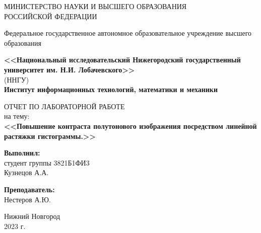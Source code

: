 \documentclass[a4paper,12pt]{article}
\begin{document}
\begin{titlepage}
	\begin{center}
		\large
		{МИНИСТЕРСТВО НАУКИ И ВЫСШЕГО ОБРАЗОВАНИЯ\\ РОССИЙСКОЙ ФЕДЕРАЦИИ}
		
		Федеральное государственное автономное образовательное учреждение высшего образования
		\vspace{0.5cm}
		
		\textbf{<<Национальный исследовательский Нижегородский государственный университет им. Н.И. Лобачевского>>}\\
		(ННГУ)\\
		\vspace{1cm}
		\textbf{Институт информационных технологий, математики и механики}\\
		\vfill
		
		\Large
		ОТЧЕТ ПО ЛАБОРАТОРНОЙ РАБОТЕ\\
		на тему:\\
		\textbf{<<Повышение контраста полутонового изображения посредством 
линейной растяжки гистограммы.>>}
		{\LARGE 
		}
		\bigskip
		
		
	\end{center}
	\vfill
	
	\newlength{\ML}
	\hfill\begin{minipage}{0.4\textwidth}
		\textbf{Выполнил:}\\
		студент группы 3821Б1ФИ3\\
		\underline{\hspace{3cm}} Кузнецов А.А.\\
	\end{minipage}%
	\bigskip
	
	\hfill\begin{minipage}{0.4\textwidth}
		\textbf{Преподаватель:}\\
		\underline{\hspace{3cm}} Нестеров А.Ю. \\
	\end{minipage}%
	\vfill
	
	\begin{center}
		Нижний Новгород\\
		2023 г.
	\end{center}
\end{titlepage}

\thispagestyle{empty} %
\end{document}
